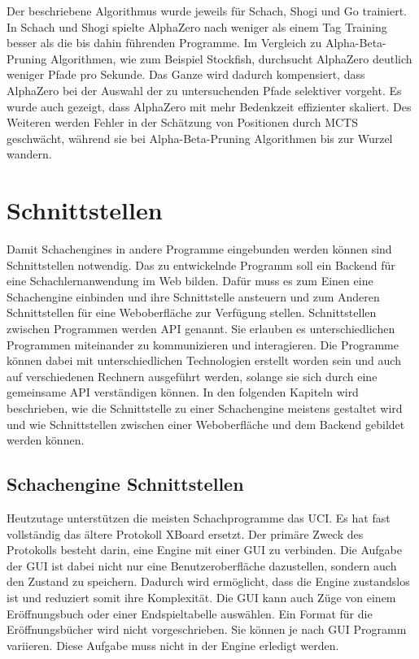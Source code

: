 Der beschriebene Algorithmus wurde jeweils für Schach, Shogi und Go trainiert. In Schach und Shogi spielte AlphaZero nach weniger als einem Tag Training besser als die bis dahin führenden Programme. Im Vergleich zu Alpha-Beta-Pruning Algorithmen, wie zum Beispiel Stockfish, durchsucht AlphaZero deutlich weniger Pfade pro Sekunde. Das Ganze wird dadurch kompensiert, dass AlphaZero bei der Auswahl der zu untersuchenden Pfade selektiver vorgeht. Es wurde auch gezeigt, dass AlphaZero mit mehr Bedenkzeit effizienter skaliert. Des Weiteren werden Fehler in der Schätzung von Positionen durch \ac{MCTS} geschwächt, während sie bei Alpha-Beta-Pruning Algorithmen bis zur Wurzel wandern.
\cite{silver_mastering_2017}

\section{Schnittstellen}
Damit Schachengines in andere Programme eingebunden werden können sind Schnittstellen notwendig.
Das zu entwickelnde Programm soll ein Backend für eine Schachlernanwendung im Web bilden. Dafür muss es zum Einen eine Schachengine einbinden und ihre Schnittstelle ansteuern und zum Anderen Schnittstellen für eine Weboberfläche zur Verfügung stellen.
Schnittstellen zwischen Programmen werden \ac{API} genannt. Sie erlauben es unterschiedlichen Programmen miteinander zu kommunizieren und interagieren. Die Programme können dabei mit unterschiedlichen Technologien erstellt worden sein und auch auf verschiedenen Rechnern ausgeführt werden, solange sie sich durch eine gemeinsame \ac{API} verständigen können.
In den folgenden Kapiteln wird beschrieben, wie die Schnittstelle zu einer Schachengine meistens gestaltet wird und wie Schnittstellen zwischen einer Weboberfläche und dem Backend gebildet werden können.

\subsection{Schachengine Schnittstellen}
Heutzutage unterstützen die meisten Schachprogramme das \ac{UCI}. Es hat fast vollständig das ältere Protokoll XBoard ersetzt. Der primäre Zweck des Protokolls besteht darin, eine Engine mit einer GUI zu verbinden. Die Aufgabe der GUI ist dabei nicht nur eine Benutzeroberfläche dazustellen, sondern auch den Zustand zu speichern. Dadurch wird ermöglicht, dass die Engine zustandslos ist und reduziert somit ihre Komplexität. Die GUI kann auch Züge von einem Eröffnungsbuch oder einer Endspieltabelle auswählen. Ein Format für die Eröffnungsbücher wird nicht vorgeschrieben. Sie können je nach GUI Programm variieren. Diese Aufgabe muss nicht in der Engine erledigt werden.
\cite{wikipedia_foundation_inc_universal_2024}

